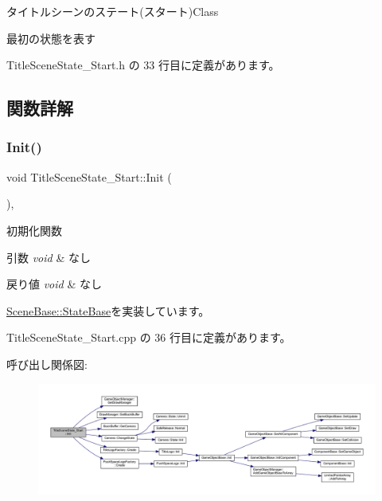 タイトルシーンのステート(スタート)Class

最初の状態を表す 

 Title\+Scene\+State\+\_\+\+Start.\+h の 33 行目に定義があります。



\subsection{関数詳解}
\mbox{\label{class_title_scene_state___start_a3e785ba088ac3fd0989fd657e5d0cd34}} 
\subsubsection{\texorpdfstring{Init()}{Init()}}
{\footnotesize\ttfamily void Title\+Scene\+State\+\_\+\+Start\+::\+Init (\begin{DoxyParamCaption}{ }\end{DoxyParamCaption})\hspace{0.3cm}{\ttfamily [override]}, {\ttfamily [virtual]}}



初期化関数 


\begin{DoxyParams}{引数}
{\em void} & なし \\
\hline
\end{DoxyParams}

\begin{DoxyRetVals}{戻り値}
{\em void} & なし \\
\hline
\end{DoxyRetVals}


\mbox{\hyperlink{class_scene_base_1_1_state_base_a33350231b039a2178c19beac0211c5b8}{Scene\+Base\+::\+State\+Base}}を実装しています。



 Title\+Scene\+State\+\_\+\+Start.\+cpp の 36 行目に定義があります。

呼び出し関係図\+:\nopagebreak
\begin{figure}[H]
\begin{center}
\leavevmode
\includegraphics[width=350pt]{class_title_scene_state___start_a3e785ba088ac3fd0989fd657e5d0cd34_cgraph}
\end{center}
\end{figure}
\mbox{\label{class_title_scene_state___start_af4dfe902a4391ca8f0cff5d1aa9507f8}} 
